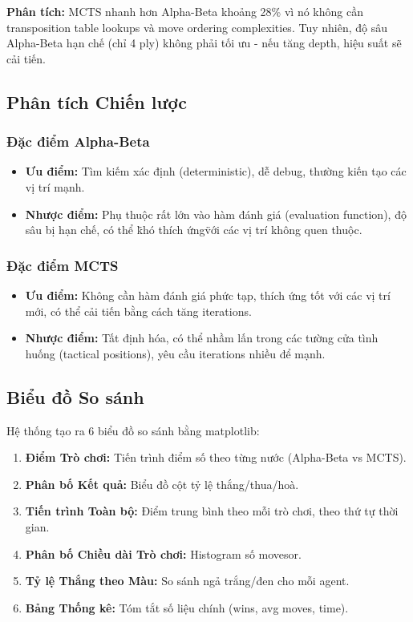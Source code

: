 \textbf{Phân tích:} MCTS nhanh hơn Alpha-Beta khoảng 28\% vì nó không cần transposition table lookups và move ordering complexities. Tuy nhiên, độ sâu Alpha-Beta hạn chế (chỉ 4 ply) không phải tối ưu - nếu tăng depth, hiệu suất sẽ cải tiến.

\subsection{Phân tích Chiến lược}

\subsubsection{Đặc điểm Alpha-Beta}
\begin{itemize}
    \item \textbf{Ưu điểm:} Tìm kiếm xác định (deterministic), dễ debug, thường kiến tạo các vị trí mạnh.
    \item \textbf{Nhược điểm:} Phụ thuộc rất lớn vào hàm đánh giá (evaluation function), độ sâu bị hạn chế, có thể \"khó thích ứng\" với các vị trí không quen thuộc.
\end{itemize}

\subsubsection{Đặc điểm MCTS}
\begin{itemize}
    \item \textbf{Ưu điểm:} Không cần hàm đánh giá phức tạp, thích ứng tốt với các vị trí mới, có thể cải tiến bằng cách tăng iterations.
    \item \textbf{Nhược điểm:} Tất định hóa, có thể nhầm lấn trong các tường cửa tình huống (tactical positions), yêu cầu iterations nhiều để mạnh.
\end{itemize}

\subsection{Biểu đồ So sánh}

Hệ thống tạo ra 6 biểu đồ so sánh bằng matplotlib:
\begin{enumerate}
    \item \textbf{Điểm Trò chơi:} Tiến trình điểm số theo từng nước (Alpha-Beta vs MCTS).
    \item \textbf{Phân bố Kết quả:} Biểu đồ cột tỷ lệ thắng/thua/hoà.
    \item \textbf{Tiến trình Toàn bộ:} Điểm trung bình theo mỗi trò chơi, theo thứ tự thời gian.
    \item \textbf{Phân bố Chiều dài Trò chơi:} Histogram số movesor.
    \item \textbf{Tỷ lệ Thắng theo Màu:} So sánh ngả trắng/đen cho mỗi agent.
    \item \textbf{Bảng Thống kê:} Tóm tắt số liệu chính (wins, avg moves, time).
\end{enumerate}

